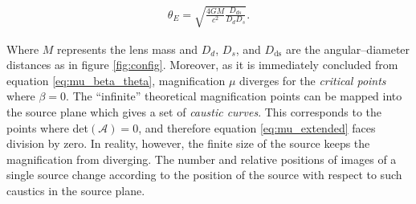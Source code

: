 \documentclass[a4wide,12pt]{book}
\begin{document}
{\begin{eqnarray}
\theta_E = \sqrt{\frac{4GM}{c^2}\frac{D_{ds}}{D_dD_s}}.
\label{eq:lens}
\end{eqnarray}

 Where $M$ represents the lens mass and $D_d$, $D_s$, and $D_\mathrm{ds}$ are the angular--diameter distances as in figure \ref{fig:config}. Moreover, as it is immediately concluded from equation \ref{eq:mu_beta_theta}, magnification $\mu$ diverges for the \emph{critical points} where $\beta=0$. The ``infinite'' theoretical magnification points can be mapped into the source plane which gives a set of \emph{caustic curves}. This corresponds to the points where det$(\mathcal{A}) = 0$, and therefore equation \ref{eq:mu_extended} faces division by zero. In reality, however, the finite size of the source keeps the magnification from diverging. The number and relative positions of images of a single source change according to the position of the source with respect to such caustics in the source plane. %


}
\end{document}
